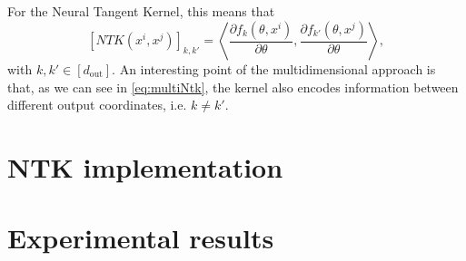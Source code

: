 \documentclass[11pt,notitlepage]{article}
\numberwithin{equation}{section}
\theoremstyle{remark}
\theoremstyle{definition}
\begin{document}
	For the Neural Tangent Kernel, this means that 
	\begin{equation}\label{eq:multiNtk}
	[NTK(x^i,x^j)]_{k, k'} = \left\langle \frac{\partial f_k (\theta, x^i)}{\partial \theta}, \frac{\partial f_{k'} (\theta, x^j)}{\partial \theta} \right\rangle,
	\end{equation}
	with $k,k' \in [d_\text{out}]$.
	An interesting point of the multidimensional approach is that, as we can see in \eqref{eq:multiNtk}, the kernel also encodes information between different output coordinates, i.e. $k \neq k'$.
	
	
	\section{NTK implementation}\label{sec:implementation}
	
	\section{Experimental results}\label{sec:experiments}
	
	
\end{document}
